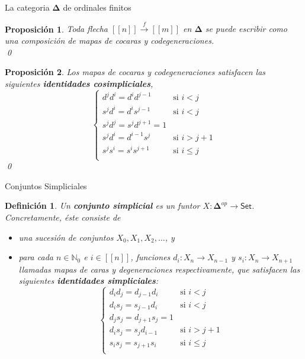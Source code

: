\documentclass[11pt]{beamer}
\newcommand{\N}{\mathbb{N}}
\newcommand{\nat}[1]{[\![#1]\!]}
\newcommand{\ord}[1]{\nat{#1}}
\newcommand{\cat}[1]{\mathsf{#1}}
\newcommand{\ordcat}{\boldsymbol{\Delta}}
\newtheorem{defs}{Definición}
\newtheorem{prop}{Proposición}
\begin{document}
\begin{frame}{La categoria $\ordcat$ de ordinales finitos}
\begin{prop} Toda flecha $\ord{n} \xrightarrow{f} \ord{m}$ en $\ordcat$ se puede escribir como una composición de mapas de cocaras y codegeneraciones. \\ \qed
\end{prop}

\begin{prop} Los mapas de cocaras y codegeneraciones satisfacen las siguientes \textbf{identidades cosimpliciales},
\[
\begin{cases}
d^jd^i = d^id^{j-1} &\text{si $i < j$}\\
s^jd^i = d^is^{j-1} &\text{si $i < j$}\\
s^jd^j = s^jd^{j+1} = 1\\
s^jd^i = d^{i-1}s^j &\text{si $i > j+1$}\\
s^js^i = s^is^{j+1} &\text{si $i \leq j$}\\
\end{cases}
\]
\qed \\
\end{prop}
\end{frame}

\begin{frame}{Conjuntos Simpliciales}

\begin{defs} Un \textbf{conjunto simplicial} es un funtor $X : \ordcat^{op} \to \cat{Set}$. Concretamente, éste consiste de 
\begin{itemize}
\item[(i)] una sucesión de conjuntos $X_0,X_1,X_2, \dots$, y \item[(ii)] para cada $n \in \N_0$ e $i \in \ord{n}$, funciones 
$d_i : X_n \to X_{n-1}$ y $s_i : X_n \to X_{n+1}$ llamadas mapas de caras y degeneraciones respectivamente, que satisfacen las siguientes \textbf{identidades simpliciales}:
\[
\begin{cases}
d_id_j = d_{j-1}d_i &\text{si $i < j$}\\
d_is_j = s_{j-1}d_i &\text{si $i < j$}\\
d_js_j = d_{j+1}s_j = 1\\
d_is_j = s_jd_{i-1} &\text{si $i > j+1$}\\
s_is_j = s_{j+1}s_i &\text{si $i \leq j$}\\
\end{cases}
\] 
\end{itemize}
\end{defs}
\end{frame}
\end{document}
